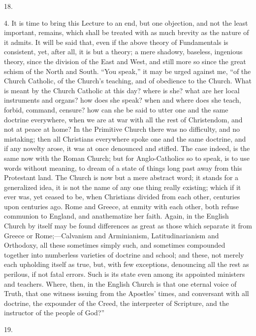 18.

4. It is time to bring this Lecture to an end, but one objection,
and not the least important, remains, which shall be treated with as
much brevity as the nature of it admits. It will be said that, even if
the above theory of Fundamentals is consistent, yet, after all, it is
but a theory; a mere shadowy, baseless, ingenious theory, since the
division of the East and West, and still more so since the great
schism of the North and South. ``You speak,'' it may be urged
against me, ``of the Church Catholic, of the Church's teaching,
and of obedience to the Church. What is meant by the Church Catholic
at this day? where is she? what are her local instruments and organs?
how does she speak? when and where does she teach, forbid, command,
censure? how can she be said to utter one and the same doctrine
everywhere, when we are at war with all the rest of Christendom, and
not at peace at home? In the Primitive Church there was no difficulty,
and no mistaking; then all Christians everywhere spoke one and the
same doctrine, and if any novelty arose, it was at once denounced and
stifled. The case indeed, is the same now with the Roman Church; but
for Anglo-Catholics so to speak, is to use words without meaning, to
dream of a state of things long past away from this Protestant land.
The Church is now but a mere abstract word; it stands for a
generalized idea, it is not the name of any one thing really existing;
which if it ever was, yet ceased to be, when Christians divided from
each other, centuries upon centuries ago. Rome and Greece, at enmity
with each other, both refuse communion to England, and anathematize
her faith. Again, in the English Church by itself may be found
differences as great as those which separate it from Greece or Rome;—Calvanism
and Arminianism, Latitudinarianism and Orthodoxy, all these sometimes
simply such, and sometimes compounded together into numberless
varieties of doctrine and school; and these, not merely each
upholding itself as true, but, with few exceptions, denouncing all the
rest as perilous, if not fatal errors. Such is its state even among
its appointed ministers and teachers. Where, then, in the English
Church is that one eternal voice of Truth, that one witness issuing
from the Apostles' times, and conversant with all doctrine, the
expounder of the Creed, the interpreter of Scripture, and the
instructor of the people of God?''

19.

